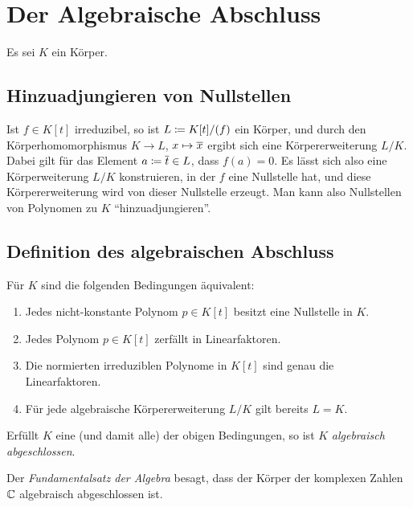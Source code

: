 \section{Der Algebraische Abschluss}

Es sei $K$ ein Körper.



\subsection{Hinzuadjungieren von Nullstellen}

Ist $f \in K[t]$ irreduzibel, so ist $L \coloneqq K[t]/(f)$ ein Körper, und durch den Körperhomomorphismus $K \to L$, $x \mapsto \overline{x}$ ergibt sich eine Körpererweiterung $L/K$.
Dabei gilt für das Element $a \coloneqq \overline{t} \in L$, dass $f(a) = 0$.
Es lässt sich also eine Körperweiterung $L/K$ konstruieren, in der $f$ eine Nullstelle hat, und diese Körpererweiterung wird von dieser Nullstelle erzeugt.
Man kann also Nullstellen von Polynomen zu $K$ \enquote{hinzuadjungieren}.



\subsection{Definition des algebraischen Abschluss}

\begin{lemma}
  Für $K$ sind die folgenden Bedingungen äquivalent:
  \begin{enumerate}
    \item
      Jedes nicht-konstante Polynom $p \in K[t]$ besitzt eine Nullstelle in $K$.
    \item
      Jedes Polynom $p \in K[t]$ zerfällt in Linearfaktoren.
    \item
      Die normierten irreduziblen Polynome in $K[t]$ sind genau die Linearfaktoren.
    \item
      Für jede algebraische Körpererweiterung $L/K$ gilt bereits $L = K$.
  \end{enumerate}
\end{lemma}

\begin{definition}
  Erfüllt $K$ eine \textup(und damit alle\textup) der obigen Bedingungen, so ist $K$ \emph{algebraisch abgeschlossen}.
\end{definition}

\begin{example}
  Der \emph{Fundamentalsatz der Algebra} besagt, dass der Körper der komplexen Zahlen $\mathbb{C}$ algebraisch abgeschlossen ist.
\end{example}

